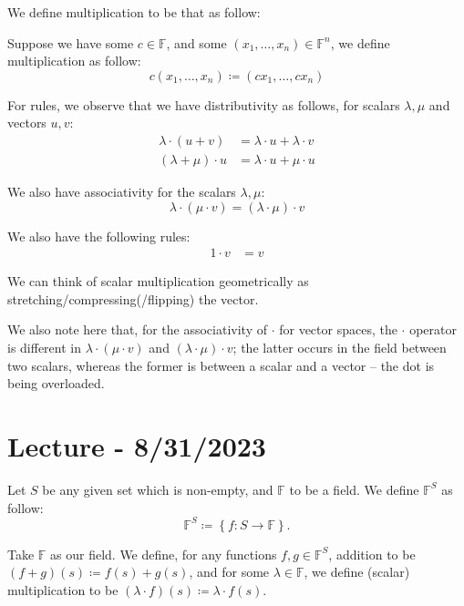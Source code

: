 \documentclass[openany]{book}
\begin{document}
	\begin{defn}
		We define multiplication to be that as follow:
		
		Suppose we have some $c \in \mathbb{F}$, and some $\left( x_{1}, \ldots, x_{n} \right) \in \mathbb{F}^{n}$, we define multiplication as follow:
		\begin{equation*}
			c\left( x_{1}, \ldots, x_{n} \right) \coloneq \left( cx_{1}, \ldots, cx_{n} \right)
		\end{equation*}
		
		For rules, we observe that we have distributivity as follows, for scalars $\lambda, \mu$ and vectors $u, v$:
		\begin{align*}
			\lambda \cdot (u + v) &= \lambda  \cdot u + \lambda \cdot v \\
			(\lambda + \mu) \cdot u &= \lambda \cdot u + \mu \cdot u
		\end{align*}
		
		We also have associativity for the scalars $\lambda, \mu$:
		\begin{equation*}
			\lambda \cdot (\mu \cdot v) = (\lambda \cdot \mu) \cdot v
		\end{equation*}
		
		We also have the following rules:
		\begin{align*}
			1 \cdot v &= v
		\end{align*}
		
	\end{defn}
	\begin{rmk}
		We can think of scalar multiplication geometrically as stretching/compressing(/flipping) the vector.
	\end{rmk}
	\begin{rmk}
		We also note here that, for the associativity of $\cdot$ for vector spaces, the $\cdot$ operator is different in $\lambda \cdot (\mu \cdot v)$ and $(\lambda \cdot \mu) \cdot v$; the latter occurs in the field between two scalars, whereas the former is between a scalar and a vector -- the dot is being overloaded.
	\end{rmk}
	
	\section{Lecture - 8/31/2023}
	\begin{example}
		Let $S$ be any given set which is non-empty, and $\mathbb{F}$ to be a field. We define $\mathbb{F}^{S}$ as follow:
		\begin{equation*}
			\mathbb{F}^{S} \coloneq \left\{  f : S \rightarrow \mathbb{F} \right\}.
		\end{equation*}
		
		Take $\mathbb{F}$ as our field. We define, for any functions $f, g \in \mathbb{F}^{S}$, addition to be $(f+g)(s) \coloneq f(s) + g(s)$, and for some $\lambda \in \mathbb{F}$, we define (scalar) multiplication to be $(\lambda \cdot f)(s) \coloneq \lambda \cdot f(s)$.
	\end{example}
	
\end{document}
